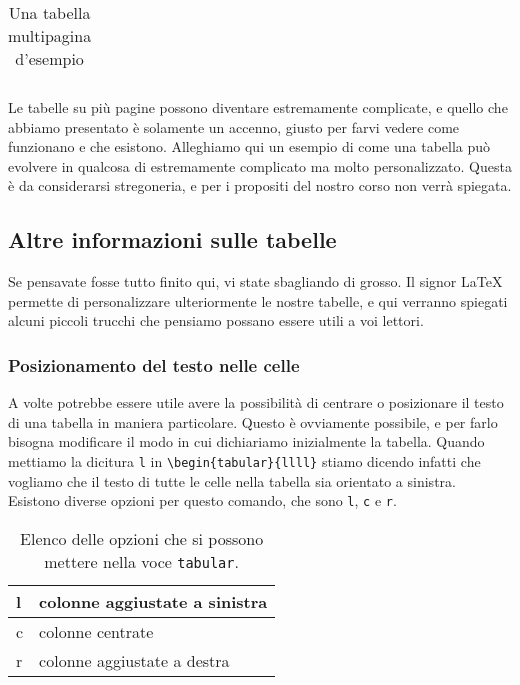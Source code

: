 \begin{center}
\begin{longtable}{llll}
\caption{Una tabella multipagina d'esempio}
\label{tabella:esempio_tabella_lunga}
\end{longtable}
\end{center}

Le tabelle su più pagine possono diventare estremamente complicate, e quello
che abbiamo presentato è solamente un accenno, giusto per farvi vedere come
funzionano e che esistono.
Alleghiamo qui un esempio di come una tabella può evolvere in qualcosa di
estremamente complicato ma molto personalizzato. Questa è da considerarsi
stregoneria, e per i propositi del nostro corso non verrà spiegata.



\subsection{Altre informazioni sulle tabelle}

Se pensavate fosse tutto finito qui, vi state sbagliando di grosso. Il signor
\LaTeX{} permette di personalizzare ulteriormente le nostre tabelle, e qui
verranno spiegati alcuni piccoli trucchi che pensiamo possano essere utili a
voi lettori.

\subsubsection{Posizionamento del testo nelle celle}

A volte potrebbe essere utile avere la possibilità di centrare o posizionare il
testo di una tabella in maniera particolare. Questo è ovviamente possibile, e
per farlo bisogna modificare il modo in cui dichiariamo inizialmente la
tabella. Quando mettiamo la dicitura \texttt{l} in
\verb!\begin{tabular}{llll}! stiamo dicendo infatti che vogliamo che il testo
di tutte le celle nella tabella sia orientato a sinistra. Esistono diverse
opzioni per questo comando, che sono \texttt{l}, \texttt{c} e \texttt{r}.

\begin{table}[H]
\centering
\begin{tabular}{|l|l|}
\hline
l & colonne aggiustate a sinistra \\ \hline
c & colonne centrate              \\ \hline
r & colonne aggiustate a destra   \\ \hline
\end{tabular}
\caption{Elenco delle opzioni che si possono mettere nella voce
\texttt{tabular}.}
\label{tab:elenco_opzioni_tabella}
\end{table}

